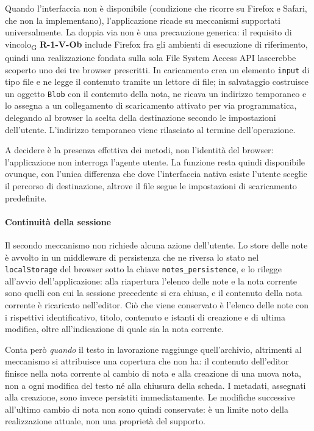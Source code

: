 \documentclass[a4paper, 10pt]{article}
\begin{document}
Quando l'interfaccia non è disponibile (condizione che ricorre su Firefox e Safari, che non la implementano), l'applicazione ricade su meccanismi supportati universalmente. La doppia via non è una precauzione generica: il requisito di vincolo\textsubscript{G} \textbf{R-1-V-Ob} include Firefox fra gli ambienti di esecuzione di riferimento, quindi una realizzazione fondata sulla sola File System Access API lascerebbe scoperto uno dei tre browser prescritti. In caricamento crea un elemento \texttt{input} di tipo file e ne legge il contenuto tramite un lettore di file; in salvataggio costruisce un oggetto \texttt{Blob} con il contenuto della nota, ne ricava un indirizzo temporaneo e lo assegna a un collegamento di scaricamento attivato per via programmatica, delegando al browser la scelta della destinazione secondo le impostazioni dell'utente. L'indirizzo temporaneo viene rilasciato al termine dell'operazione.

A decidere è la presenza effettiva dei metodi, non l'identità del browser: l'applicazione non interroga l'agente utente. La funzione resta quindi disponibile ovunque, con l'unica differenza che dove l'interfaccia nativa esiste l'utente sceglie il percorso di destinazione, altrove il file segue le impostazioni di scaricamento predefinite.

\paragraph{Continuità della sessione}
Il secondo meccanismo non richiede alcuna azione dell'utente. Lo store delle note è avvolto in un middleware di persistenza che ne riversa lo stato nel \texttt{localStorage} del browser sotto la chiave \texttt{notes\_persistence}, e lo rilegge all'avvio dell'applicazione: alla riapertura l'elenco delle note e la nota corrente sono quelli con cui la sessione precedente si era chiusa, e il contenuto della nota corrente è ricaricato nell'editor. Ciò che viene conservato è l'elenco delle note con i rispettivi identificativo, titolo, contenuto e istanti di creazione e di ultima modifica, oltre all'indicazione di quale sia la nota corrente.

Conta però \textit{quando} il testo in lavorazione raggiunge quell'archivio, altrimenti al meccanismo si attribuisce una copertura che non ha: il contenuto dell'editor finisce nella nota corrente al cambio di nota e alla creazione di una nuova nota, non a ogni modifica del testo né alla chiusura della scheda. I metadati, assegnati alla creazione, sono invece persistiti immediatamente. Le modifiche successive all'ultimo cambio di nota non sono quindi conservate: è un limite noto della realizzazione attuale, non una proprietà del supporto.
\end{document}
